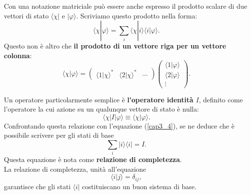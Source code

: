 Con una notazione matriciale può essere anche espresso il prodotto scalare di due vettori di stato $\langle \chi |$ e $ | \varphi \rangle $. Scriviamo questo prodotto nella forma:
	\begin{equation}
		\langle \chi | \varphi \rangle = \sum \limits_{i} \langle \chi | i \rangle \langle i | \varphi \rangle .
	\end{equation}
Questo non è altro che \textbf{il prodotto di un vettore riga per un vettore colonna}:
	\begin{equation}
		\boxed{
			\langle \chi | \varphi \rangle = 
			\begin{pmatrix}
			\langle 1 | \chi \rangle ^* & \langle 2 | \chi \rangle ^* & \cdots 
			\end{pmatrix}
			\begin{pmatrix}
			\langle 1 | \varphi \rangle \\ 
			\langle 2 | \varphi \rangle 
			\\ \vdots 
			\end{pmatrix} .
			}
	\end{equation}

Un operatore particolarmente semplice è \textbf{l'operatore identità $I$}, definito come l'operatore la cui azione su un qualunque vettore di stato è nulla:
	\begin{equation}
		\boxed{		
			\langle \chi | I | \varphi \rangle \equiv \langle \chi | \varphi \rangle .
			}
	\end{equation}
Confrontando questa relazione con l'equazione (\ref{cap3_4}), se ne deduce che è possibile scrivere per gli stati di base
	\begin{equation}
		\boxed{\boxed{
			\sum \limits_{i} | i \rangle \langle i | = I .
			}}
	\end{equation}
Questa equazione è nota come \textbf{relazione di completezza}.\\
La relazione di completezza, unità all'equazione
\begin{equation}
\langle i | j \rangle =\delta_{ij} ,
\end{equation}
garantisce che gli stati $\langle i | $ costituiscano un buon sistema di base.\\

